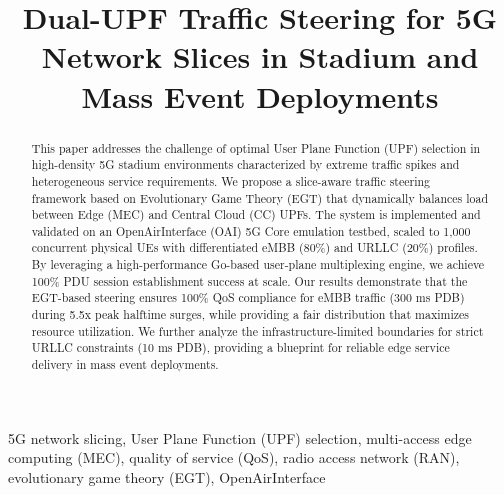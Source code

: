 \documentclass[conference]{IEEEtran}
\begin{document}
\title{Dual-UPF Traffic Steering for 5G Network Slices in Stadium and Mass Event Deployments}

\author{
\and
{}
\and
{}
}

\maketitle

\begin{abstract}
This paper addresses the challenge of optimal User Plane Function (UPF) selection in high-density 5G stadium environments characterized by extreme traffic spikes and heterogeneous service requirements. We propose a slice-aware traffic steering framework based on Evolutionary Game Theory (EGT) that dynamically balances load between Edge (MEC) and Central Cloud (CC) UPFs. The system is implemented and validated on an OpenAirInterface (OAI) 5G Core emulation testbed, scaled to 1,000 concurrent physical UEs with differentiated eMBB (80\%) and URLLC (20\%) profiles. By leveraging a high-performance Go-based user-plane multiplexing engine, we achieve 100\% PDU session establishment success at scale. Our results demonstrate that the EGT-based steering ensures 100\% QoS compliance for eMBB traffic (300 ms PDB) during 5.5x peak halftime surges, while providing a fair distribution that maximizes resource utilization. We further analyze the infrastructure-limited boundaries for strict URLLC constraints (10 ms PDB), providing a blueprint for reliable edge service delivery in mass event deployments.
\end{abstract}

\begin{IEEEkeywords}
5G network slicing, User Plane Function (UPF) selection,
multi-access edge computing (MEC), quality of service (QoS),
radio access network (RAN), evolutionary game theory (EGT),
OpenAirInterface
\end{IEEEkeywords}
\end{document}
